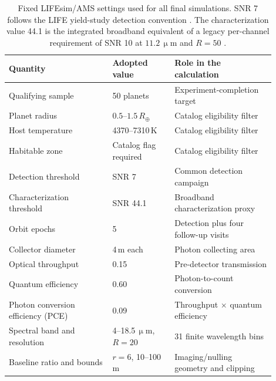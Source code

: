 \documentclass[12pt,a4paper]{article}
\numberwithin{equation}{section}
\numberwithin{figure}{section}
\numberwithin{table}{section}
\begin{document}
\begin{table}[htbp]
\centering
\begin{tabular}{@{}p{0.35\linewidth}p{0.21\linewidth}p{0.34\linewidth}@{}}
\toprule
Quantity & Adopted value & Role in the calculation \\
\midrule
Qualifying sample & 50 planets & Experiment-completion target \\
Planet radius & $0.5$--$1.5\,R_\oplus$ & Catalog eligibility filter \\
Host temperature & 4370--7310\,K & Catalog eligibility filter \\
Habitable zone & Catalog flag required & Catalog eligibility filter \\
Detection threshold & SNR 7 & Common detection campaign \\
Characterization threshold & SNR 44.1 & Broadband characterization proxy \\
Orbit epochs & 5 & Detection plus four follow-up visits \\
Collector diameter & 4\,m each & Photon collecting area \\
Optical throughput & 0.15 & Pre-detector transmission \\
Quantum efficiency & 0.60 & Photon-to-count conversion \\
Photon conversion efficiency (PCE) & 0.09 & Throughput $\times$ quantum efficiency \\
Spectral band and resolution & 4--18.5\,$\upmu$m, $R=20$ & 31 finite wavelength bins \\
Baseline ratio and bounds & $r=6$, 10--100\,m & Imaging/nulling geometry and clipping \\
\bottomrule
\end{tabular}
\caption{Fixed LIFEsim/AMS settings used for all final simulations. SNR 7 follows the LIFE yield-study detection convention \cite{kammerer2022life6}. The characterization value 44.1 is the integrated broadband equivalent of a legacy per-channel requirement of SNR 10 at $11.2\,\upmu$m and $R=50$ \cite{dannert2025thesis}.}
\label{tab: study assumptions}
\end{table}
\end{document}
